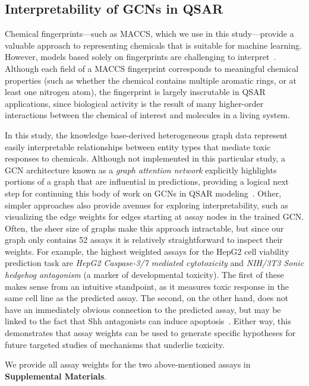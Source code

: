 \documentclass{ws-procs11x85}
\begin{document}
\subsection{Interpretability of GCNs in QSAR}\label{interpret}
Chemical fingerprints---such as MACCS, which we use in this study---provide a valuable approach to representing chemicals that is suitable for machine learning.
However, models based solely on fingerprints are challenging to interpret~\cite{cherkasov2014qsar,matveieva2021benchmarks}.
Although each field of a MACCS fingerprint corresponds to meaningful chemical properties (such as whether the chemical contains multiple aromatic rings, or at least one nitrogen atom), the fingerprint is largely inscrutable in QSAR applications, since biological activity is the result of many higher-order interactions between the chemical of interest and molecules in a living system.

In this study, the knowledge base-derived heterogeneous graph data represent easily interpretable relationships between entity types that mediate toxic responses to chemicals.
Although not implemented in this particular study, a GCN architecture known as a \textit{graph attention network} explicitly highlights portions of a graph that are influential in predictions, providing a logical next step for continuing this body of work on GCNs in QSAR modeling~\cite{wang2019heterogeneous}.
Other, simpler approaches also provide avenues for exploring interpretability, such as visualizing the edge weights for edges starting at assay nodes in the trained GCN.
Often, the sheer size of graphs make this approach intractable, but since our graph only contains 52 assays it is relatively straightforward to inspect their weights.
For example, the highest weighted assays for the HepG2 cell viability prediction task are \textit{HepG2 Caspase-3/7 mediated cytotoxicity} and \textit{NIH/3T3 Sonic hedgehog antagonism} (a marker of developmental toxicity).
The first of these makes sense from an intuitive standpoint, as it measures toxic response in the same cell line as the predicted assay.
The second, on the other hand, does not have an immediately obvious connection to the predicted assay, but may be linked to the fact that Shh antagonists can induce apoptosis~\cite{wu2017smoothened}.
Either way, this demonstrates that assay weights can be used to generate specific hypotheses for future targeted studies of mechanisms that underlie toxicity.

We provide all assay weights for the two above-mentioned assays in \textbf{Supplemental Materials}.
\end{document}
